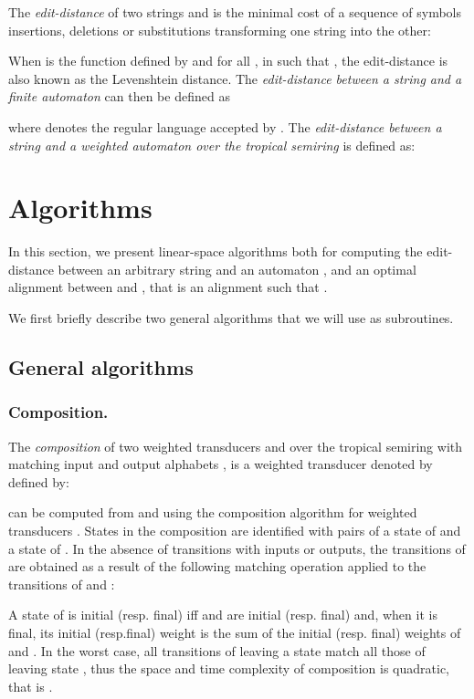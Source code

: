 \documentclass{llncs}
\newcommand{\0}{\overline{0}}
\newcommand{\1}{\overline{1}}
\newcommand{\+}{\oplus}
\renewcommand{\.}{\otimes}
\begin{document}
\begin{definition}
  The {\em edit-distance}  of two strings  and  is the
  minimal cost of a sequence of symbols insertions, deletions or
  substitutions transforming one string into the other:

  When  is the function defined by  and  for all ,  in
   such that , the edit-distance is also known as
  the Levenshtein distance. The {\em edit-distance  between a
  string  and a finite automaton } can then be defined as

  where  denotes the regular language accepted by . The {\em
  edit-distance  between a string  and a weighted automaton
   over the tropical semiring} is defined as:

\end{definition}

\section{Algorithms}
\label{sec:algo}

In this section, we present linear-space algorithms both for computing
the edit-distance  between an arbitrary string  and an
automaton , and an optimal alignment between  and , that is
an alignment  such that .

We first briefly describe two general algorithms that we will use as
subroutines.

\subsection{General algorithms}

\subsubsection{Composition.}
\label{sec:composition}

The {\em composition} of two weighted transducers  and  over
the tropical semiring with matching input and output alphabets
, is a weighted transducer denoted by  defined by:

 can be computed from  and  using the
composition algorithm for weighted transducers
\cite{pereira-riley,ecai}. States in the composition 
are identified with pairs of a state of  and a state of . In
the absence of transitions with  inputs or outputs, the
transitions of  are obtained as a result of the
following matching operation applied to the transitions of  and
:

A state  of  is initial (resp. final) iff
 and  are initial (resp. final) and, when it is final, its
initial (resp.final) weight is the sum of the initial (resp. final)
weights of  and . In the worst case, all transitions of
 leaving a state  match all those of  leaving state
, thus the space and time complexity of composition is quadratic,
that is .
\end{document}

